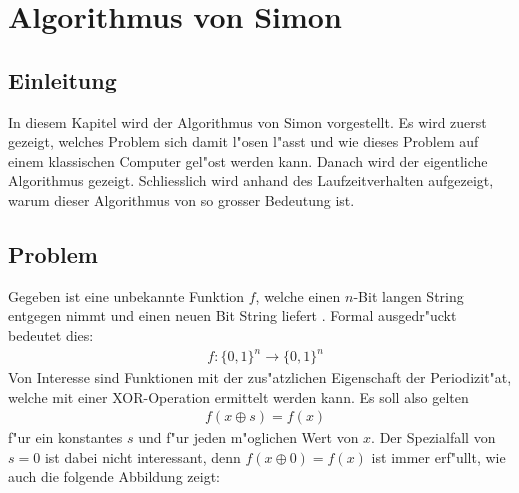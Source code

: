 \chapter{Algorithmus von Simon\label{chapter:simon}} 
\begin{refsection}

\section{Einleitung}
In diesem Kapitel wird der Algorithmus von Simon vorgestellt.  Es wird zuerst
%
%
gezeigt, welches Problem sich damit l"osen l"asst und wie dieses Problem auf
einem klassischen Computer gel"ost werden kann. Danach wird der eigentliche
Algorithmus gezeigt. Schliesslich wird anhand des Laufzeitverhalten aufgezeigt,
warum dieser Algorithmus von so grosser Bedeutung ist.
\section{Problem}
Gegeben ist eine unbekannte Funktion $f$, welche einen $n$-Bit langen String
entgegen nimmt und einen neuen Bit String liefert
\cite{simon:cse599d-dave-bacon}. Formal ausgedr"uckt bedeutet dies:
\begin{align*}
  &f\colon\{0,1\}^n\to\{0,1\}^n
\end{align*}
Von Interesse sind Funktionen mit der zus"atzlichen Eigenschaft der
Periodizit"at, welche mit einer XOR-Operation ermittelt werden kann.
%
Es soll also gelten
\begin{align*}
  &f(x \oplus s) = f(x)
\end{align*}
f"ur ein konstantes $s$ und f"ur jeden m"oglichen Wert von $x$. 
Der Spezialfall von $s = 0$ ist dabei nicht interessant, denn $f(x \oplus 0)
= f(x)$ ist immer erf"ullt, wie auch die folgende Abbildung zeigt:
\begin{figure}[H]
 \centering
\end{figure}
\end{refsection}
